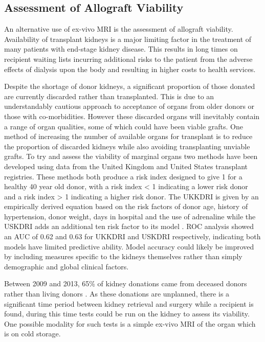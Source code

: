 \newpage
\subsection{Assessment of Allograft Viability}
An alternative use of ex-vivo \ac{MRI} is the assessment of allograft viability. Availability of transplant kidneys is a major limiting factor in the treatment of many patients with end-stage kidney disease. This results in long times on recipient waiting lists incurring additional risks to the patient from the adverse effects of dialysis upon the body and resulting in higher costs to health services. 

Despite the shortage of donor kidneys, a significant proportion of those donated are currently discarded rather than transplanted. This is due to an understandably cautious approach to acceptance of organs from older donors or those with co-morbidities. However these discarded organs will inevitably contain a range of organ qualities, some of which could have been viable grafts. One method of increasing the number of available organs for transplant is to reduce the proportion of discarded kidneys while also avoiding transplanting unviable grafts. To try and assess the viability of marginal organs two methods have been developed using data from the United Kingdom and United States transplant registries. These methods both produce a risk index designed to give 1 for a healthy 40 year old donor, with a risk index < 1 indicating a lower risk donor and a risk index > 1 indicating a higher risk donor. The \ac{UKKDRI} is given by an empirically derived equation based on the risk factors of donor age, history of hypertension, donor weight, days in hospital and the use of adrenaline \cite{watson_simplified_2012} while the \ac{USKDRI} adds an additional ten risk factor to its model \cite{rao_comprehensive_2009}. \ac{ROC} analysis showed an \ac{AUC} of 0.62 and 0.63 for \ac{UKKDRI} and \ac{USKDRI} respectively, indicating both models have limited predictive ability. Model accuracy could likely be improved by including measures specific to the kidneys themselves rather than simply demographic and global clinical factors.

\newpage
Between 2009 and 2013, 65\% of kidney donations came from deceased donors rather than living donors \cite{burton_causes_2019}. As these donations are unplanned, there is a significant time period between kidney retrieval and surgery while a recipient is found, during this time tests could be run on the kidney to assess its viability. One possible modality for such tests is a simple ex-vivo \ac{MRI} of the organ which is on cold storage.

